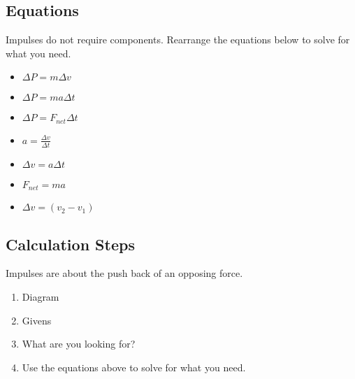 \begin{adjustwidth}{1cm}{0pt}
    \subsection*{Equations}
    \begin{flushleft}
        Impulses do not require components. Rearrange the equations below to solve for what you need.
    \end{flushleft}
    \vspace*{7pt}
    \noindent
    \begin{minipage}{0.33\textwidth}
        \begin{itemize}
            \item $\Delta P = m\Delta v$
            \item $\Delta P = ma\Delta t$
            \item $\Delta P = F_{net}\Delta t$
        \end{itemize}
    \end{minipage}
    \begin{minipage}{0.33\textwidth}
        \begin{itemize}
            \item $a = \frac{\Delta v}{\Delta t}$
            \item $\Delta v = a \Delta t$
            \item $F_{net} = ma$
            \item $\Delta v = (v_{2} - v_{1})$
        \end{itemize}
    \end{minipage}
    \subsection*{Calculation Steps}
    \begin{flushleft}
        Impulses are about the push back of an opposing force.
    \end{flushleft}
    \vspace*{5pt}
    \begin{adjustwidth}{0.5cm}{0pt}
        \begin{enumerate}
            \item Diagram
            \item Givens
            \item What are you looking for?
            \item Use the equations above to solve for what you need.
        \end{enumerate}
    \end{adjustwidth}
\end{adjustwidth}